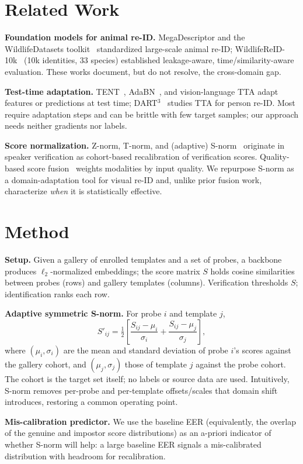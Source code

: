 \documentclass[conference]{IEEEtran}
\begin{document}
\section{Related Work}
\textbf{Foundation models for animal re-ID.} MegaDescriptor and the WildlifeDatasets
toolkit~\cite{cermak2024} standardized large-scale animal re-ID; WildlifeReID-10k~\cite{adam2024}
(10k identities, 33 species) established leakage-aware, time/similarity-aware evaluation. These works
document, but do not resolve, the cross-domain gap.

\textbf{Test-time adaptation.} TENT~\cite{wang2021}, AdaBN~\cite{li2017}, and vision-language TTA
adapt features or predictions at test time; DART$^3$~\cite{dart2025} studies TTA for person re-ID.
Most require adaptation steps and can be brittle with few target samples; our approach needs neither
gradients nor labels.

\textbf{Score normalization.} Z-norm, T-norm, and (adaptive) S-norm~\cite{auckenthaler2000} originate
in speaker verification as cohort-based recalibration of verification scores. Quality-based score
fusion~\cite{nandakumar2006} weights modalities by input quality. We repurpose S-norm as a
domain-adaptation tool for visual re-ID and, unlike prior fusion work, characterize \emph{when} it is
statistically effective.

\section{Method}
\textbf{Setup.} Given a gallery of enrolled templates and a set of probes, a backbone produces
$\ell_2$-normalized embeddings; the score matrix $S$ holds cosine similarities between probes (rows)
and gallery templates (columns). Verification thresholds $S$; identification ranks each row.

\textbf{Adaptive symmetric S-norm.} For probe $i$ and template $j$,
\begin{equation}
S'_{ij} = \tfrac{1}{2}\!\left[\frac{S_{ij}-\mu_i}{\sigma_i} + \frac{S_{ij}-\mu_j}{\sigma_j}\right],
\end{equation}
where $(\mu_i,\sigma_i)$ are the mean and standard deviation of probe $i$'s scores against the
gallery cohort, and $(\mu_j,\sigma_j)$ those of template $j$ against the probe cohort. The cohort is
the target set itself; no labels or source data are used. Intuitively, S-norm removes per-probe and
per-template offsets/scales that domain shift introduces, restoring a common operating point.

\textbf{Mis-calibration predictor.} We use the baseline EER (equivalently, the overlap of the genuine
and impostor score distributions) as an a-priori indicator of whether S-norm will help: a large
baseline EER signals a mis-calibrated distribution with headroom for recalibration.
\end{document}
